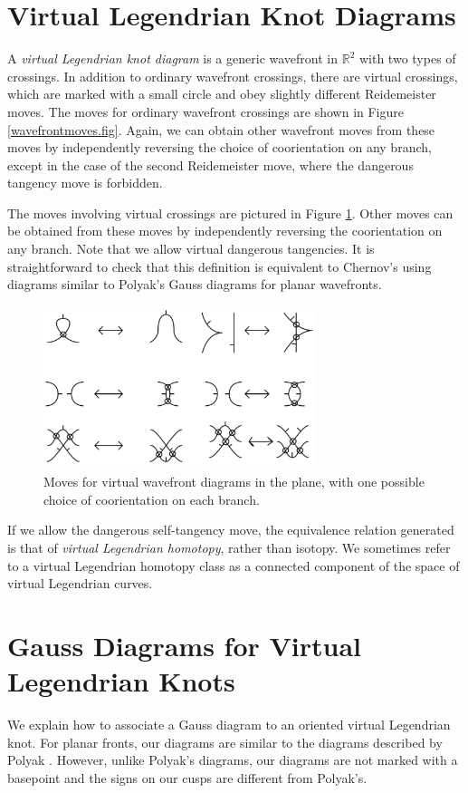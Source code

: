 \section{Virtual Legendrian Knot Diagrams}
A {\it virtual Legendrian knot diagram} is a generic wavefront in $\mathbb{R}^2$ with two types of crossings.  In addition to ordinary wavefront crossings, there are virtual crossings, which are marked with a small circle and obey slightly different Reidemeister moves.  The moves for ordinary wavefront crossings are shown in Figure \ref{wavefrontmoves.fig}.  Again, we can obtain other wavefront moves from these moves by independently reversing the choice of coorientation on any branch, except in the case of the second Reidemeister move, where the dangerous tangency move is forbidden.

The moves involving virtual crossings are pictured in Figure \ref{virtualwavefrontmoves.fig}.  Other moves can be obtained from these moves by independently reversing the coorientation on any branch.  Note that we allow virtual dangerous tangencies.  It is straightforward to check that this definition is equivalent to Chernov's using diagrams similar to Polyak's Gauss diagrams \cite{Polyak} for planar wavefronts.  


	\begin{figure}[htbp]
		\includegraphics[width=8cm]{virtualwavefrontmoves}
		\caption{Moves for virtual wavefront diagrams in the plane, with one possible choice of coorientation on each branch.}
		\label{virtualwavefrontmoves.fig}
\end{figure}

If we allow the dangerous self-tangency move, the equivalence relation generated is that of {\it virtual Legendrian homotopy}, rather than isotopy.  We sometimes refer to a virtual Legendrian homotopy class as a connected component of the space of virtual Legendrian curves.

\section{Gauss Diagrams for Virtual Legendrian Knots}
We explain how to associate a Gauss diagram to an oriented virtual Legendrian knot.  For planar fronts, our diagrams are similar to the diagrams described by Polyak \cite{Polyak}.  However, unlike Polyak's diagrams, our diagrams are not marked with a basepoint and the signs on our cusps are different from Polyak's.  




